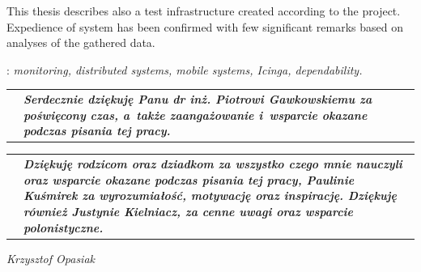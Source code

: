 \begin{titlepage}
{      \indent This thesis describes also a test infrastructure
      created according to the project. Expedience of system has been
      confirmed with few significant remarks based on analyses of the
      gathered data.  } \vspace*{1\baselineskip}

    : {\itshape monitoring, distributed
      systems, mobile systems, Icinga, dependability.}

\newpage
\thispagestyle{empty}
\hbox{}\vfill
\begin{tabular}{p{1.5cm}p{13cm}}
 & \hspace{1em} \textbf{ {\em Serdecznie dziękuję Panu dr
      inż. Piotrowi Gawkowskiemu za poświęcony czas, a~także
      zaangażowanie i~wsparcie okazane podczas pisania tej pracy.} }

\end{tabular}

\begin{tabular}{p{0.1cm}p{14.4cm}}
 & \hspace{1em} \textbf{ {\em Dziękuję rodzicom oraz dziadkom za
      wszystko czego mnie nauczyli oraz wsparcie okazane podczas
      pisania tej pracy, \mbox{Paulinie} \mbox{Kuśmirek} za wyrozumiałość, motywację
      oraz inspirację. Dziękuję również \mbox{Justynie} Kielniacz, za cenne
      uwagi oraz wsparcie polonistyczne.}}
\end{tabular}

\vspace{2cm}

\hfill {\em Krzysztof Opasiak}
\end{titlepage}

